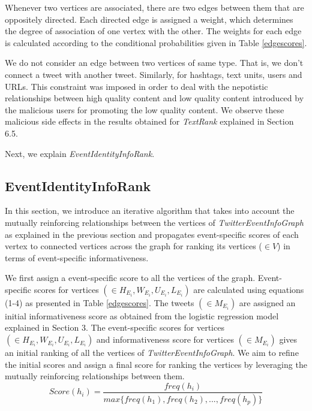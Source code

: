 Whenever two vertices are associated, there are two edges between them that are oppositely directed. Each directed edge is assigned a weight, which determines the degree of association of one vertex with the other. The weights for each edge is calculated according to the conditional probabilities given in Table \ref{edgescores}. 

We do not consider an edge between two vertices of same type. That is, we don't connect a tweet with another tweet. Similarly, for hashtags, text units, users and URLs. This constraint was imposed in order to deal with the nepotistic relationships between high quality content and low quality content introduced by the malicious users for promoting the low quality content. We observe these malicious side effects in the results obtained for \textit{TextRank} explained in Section 6.5.  

Next, we explain \textit{EventIdentityInfoRank}.


\subsection{EventIdentityInfoRank\label{twitterEventInfoRank}}
In this section, we introduce an iterative algorithm that takes into account the mutually reinforcing relationships between the vertices of \textit{TwitterEventInfoGraph} as explained in the previous section and propagates event-specific scores of each vertex to connected vertices across the graph for ranking its vertices ($\scriptstyle \in V$) in terms of event-specific informativeness.

We first assign a event-specific score to all the vertices of the graph. Event-specific scores for vertices $(\in H_{E_{i}}, W_{E_{i}}, U_{E_{i}}, L_{E_{i}})$ are calculated using equations (1-4) as presented in Table \ref{edgescores}. The tweets  $(\in M_{E_{i}})$ are assigned an initial informativeness score as obtained from the logistic regression model explained in Section 3. The event-specific scores for vertices $(\in H_{E_{i}}, W_{E_{i}}, U_{E_{i}}, L_{E_{i}})$ and informativeness score for vertices $(\in M_{E_{i}})$ gives an initial ranking of all the vertices of \textit{TwitterEventInfoGraph}. We aim to refine the initial scores and assign a final score for ranking the vertices by leveraging the mutually reinforcing relationships between them.
\begin{equation}
Score(h_{i}) = \frac{freq(h_{i})}{max\{freq(h_{1}),freq(h_{2}),...,freq(h_{p})\}}
\end{equation}


